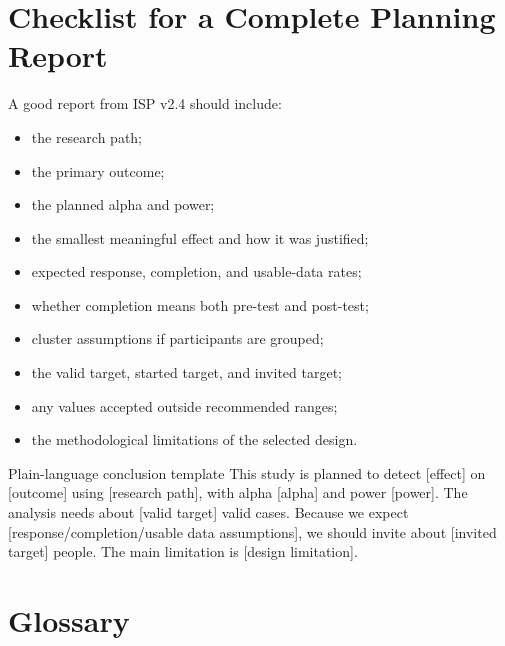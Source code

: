 \documentclass[11pt,a4paper,oneside]{report}
\newcommand{\app}{\textsf{ISP v2.4}\index{ISP v2.4}}
\begin{document}
\chapter{Checklist for a Complete Planning Report}

A good report from \app{} should include:

\begin{itemize}
  \item the research path;
  \item the primary outcome;
  \item the planned alpha and power;
  \item the smallest meaningful effect and how it was justified;
  \item expected response, completion, and usable-data rates;
  \item whether completion means both pre-test and post-test;
  \item cluster assumptions if participants are grouped;
  \item the valid target, started target, and invited target;
  \item any values accepted outside recommended ranges;
  \item the methodological limitations of the selected design.
\end{itemize}

\begin{conceptbox}{Plain-language conclusion template}
This study is planned to detect [effect] on [outcome] using [research path], with alpha [alpha] and power [power]. The analysis needs about [valid target] valid cases. Because we expect [response/completion/usable data assumptions], we should invite about [invited target] people. The main limitation is [design limitation].
\end{conceptbox}

\chapter{Glossary}
\end{document}
